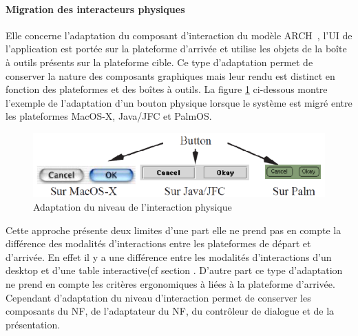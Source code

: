 \paragraph{ Migration des interacteurs physiques}
Elle concerne l'adaptation du composant d'interaction  du modèle ARCH~\cite{Pfaff1985}, l'UI de l'application est portée sur la plateforme d'arrivée et utilise les objets de la boîte à outils présents sur la plateforme cible. Ce type d'adaptation permet de conserver la nature des composants graphiques mais leur rendu est distinct en fonction des plateformes et des  boîtes à outils. La figure \ref{fig:chap2:8} ci-dessous montre l'exemple de l'adaptation  d'un bouton physique lorsque le système est migré entre les plateformes MacOS-X, Java/JFC et PalmOS.

\begin{figure}[ht]
\begin{center}
\label{fig:chap2:8}
\caption{ Adaptation du niveau de l'interaction physique}
\includegraphics[scale=1]{chap3/img-3}
\end{center}
\end{figure}

Cette approche présente deux limites d'une part elle ne prend pas en compte la différence des modalités d'interactions entre les plateformes de départ et d'arrivée. En effet il y a une différence entre les modalités d'interactions d'un desktop et d'une table interactive(cf section %
. D'autre part ce type d'adaptation ne prend en compte les critères ergonomiques à liées à la plateforme d'arrivée. Cependant d'adaptation du niveau d'interaction permet de conserver les composants du NF, de l'adaptateur du NF, du contrôleur de dialogue et de la présentation.

